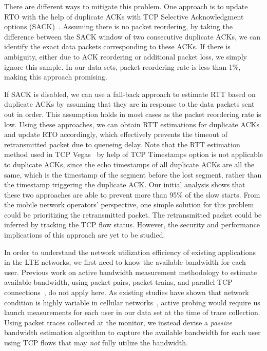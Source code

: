 There are different ways to mitigate this problem. One approach is to update RTO with the help of duplicate ACKs with TCP Selective Acknowledgment options (SACK)~\cite{rfc2018}. Assuming there is no packet reordering, by taking the difference between the SACK window of two consecutive duplicate ACKs, we can identify the exact data packets corresponding to these ACKs. If there is ambiguity, either due to ACK reordering or additional packet loss, we simply ignore this sample. In our data sets, packet reordering rate is less than 1\%, making this approach promising.

If SACK is disabled, we can use a fall-back approach to estimate RTT based on duplicate ACKs by assuming that they are in response to the data packets sent out in order. This assumption holds in most cases as the packet reordering rate is low. Using these approaches, we can obtain RTT estimations for duplicate ACKs and update RTO accordingly, which effectively prevents the timeout of retransmitted packet due to queueing delay. Note that the RTT estimation method used in TCP Vegas~\cite{tcp.vegas} by help of TCP Timestamps option is not applicable to duplicate ACKs, since the echo timestamps of all duplicate ACKs are all the same, which is the timestamp of the segment before the lost segment, rather than the timestamp triggering the duplicate ACK. Our initial analysis shows that these two approaches are able to prevent more than 95\% of the slow starts. From the mobile network operators' perspective, one simple solution for this problem could be prioritizing the retransmitted packet. The retransmitted packet could be inferred by tracking the TCP flow status. However, the security and performance implications of this approach are yet to be studied.



\label{sec:estimate}

In order to understand the network utilization efficiency of existing applications in the LTE networks, we first need to know the available bandwidth for each user. Previous work on active bandwidth measurement methodology to estimate available bandwidth, \eg using packet pairs, packet trains, and parallel TCP connections~\cite{prasad03, jain02, hu04}, do not apply here. As existing studies have shown that network condition is highly variable in cellular networks~\cite{mobisys.3gtest}, active probing would require us launch measurements for each user in our data set at the time of trace collection. Using packet traces collected at the monitor, we instead devise a \emph{passive} bandwidth estimation algorithm to capture the available bandwidth for each user using TCP flows that may \emph{not} fully utilize the bandwidth.

